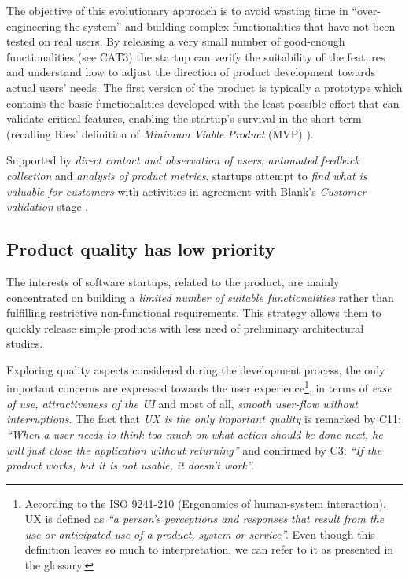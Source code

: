 \documentclass[10pt,journal,letterpaper,compsoc]{IEEEtran}
\begin{document}
The objective of this evolutionary approach is to avoid wasting time in  ``over-
engineering the system'' and building complex functionalities that have  not
been tested on real users. By releasing a very small number of good-enough
functionalities (see CAT3) the startup can verify the suitability of the
features and understand how to adjust the direction of product development
towards actual users' needs. The first version of the product is typically a
prototype which contains the basic functionalities developed with the least
possible effort that can validate critical features, enabling the startup's
survival in the short term (recalling  Ries' definition of \textit{Minimum
Viable Product} (MVP) \cite{Ries2011}).

Supported by \textit{direct contact and observation of users},
\textit{automated feedback collection} and \textit{analysis of product metrics},
startups attempt to \textit{find what is valuable for customers} with activities
in agreement with Blank's \textit{Customer validation} stage \cite{Blank2005}.

\subsection{Product quality has low priority}\label{res:gsm:cat3}
The interests of software startups, related to the product, are mainly  
concentrated on building a  \textit{limited number of suitable functionalities} 
rather than fulfilling restrictive non-functional requirements. This strategy  
allows them to quickly release simple products with less need of preliminary  
architectural studies.


Exploring quality aspects considered during the development process, the only
important concerns are expressed towards the user experience\footnote{According
to the ISO 9241-210 (Ergonomics of human-system interaction), UX is defined as
\textit{``a person's perceptions and responses that result from the use or
anticipated use of a product, system or service''.} Even though this definition
leaves so much to interpretation, we can refer to it as presented in the
glossary.}, in terms of \textit{ease of use, attractiveness of the UI} and most
of all, \textit{smooth user-flow without interruptions}. The fact that
\textit{UX is the only important quality} is remarked by C11: \textit{``When a
user needs to think too much on what action should be done next, he will just
close the application without returning''} and confirmed by C3: \textit{``If the
product works, but it is not usable, it doesn't work''.}
\end{document}
